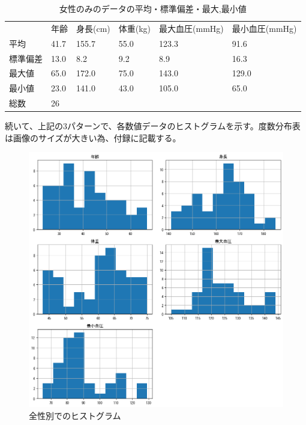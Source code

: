 \documentclass[dvipdfmx]{jsarticle}
\begin{document}
    \begin{table}[H]
        \caption{女性のみのデータの平均・標準偏差・最大,最小値}
        \centering
        \begin{tabular}{llllll}
            & \multicolumn{1}{r}{年齢} & \multicolumn{1}{r}{身長(cm)} & \multicolumn{1}{r}{体重(kg)} & \multicolumn{1}{r}{最大血圧(mmHg)} & \multicolumn{1}{r}{最小血圧(mmHg)} \\
        平均   & 41.7                   & 155.7                  & 55.0                   & 123.3                    & 91.6                     \\
        標準偏差 & 13.0                   & 8.2                    & 9.2                    & 8.9                      & 16.3                     \\
        最大値  & 65.0                   & 172.0                  & 75.0                   & 143.0                    & 129.0                    \\
        最小値  & 23.0                   & 141.0                  & 43.0                   & 105.0                    & 65.0                    \\
        \hline
        総数 & 26 &  &  &  &
        \end{tabular}
    \end{table}
    続いて、上記の3パターンで、各数値データのヒストグラムを示す。度数分布表は画像のサイズが大きい為、付録に記載する。
    \begin{figure}[H]
        \centering
        \includegraphics[scale=0.6]{./images/allgender/hist.png}
        \caption{全性別でのヒストグラム}
    \end{figure}
\end{document}
